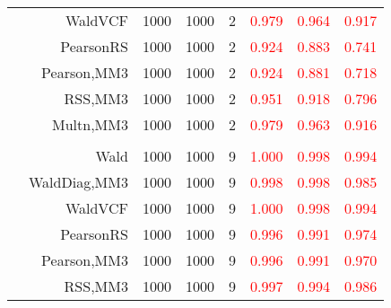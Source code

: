 \documentclass[
]{article}
\begin{document}
\begin{table}[H]
{\begin{tabular}[t]{lrrrrrrr}
\hspace{1em} & WaldVCF & 1000 & 1000 & 2 & \textcolor{red}{0.979} & \textcolor{red}{0.964} & \textcolor{red}{0.917}\\

\hspace{1em} & PearsonRS & 1000 & 1000 & 2 & \textcolor{red}{0.924} & \textcolor{red}{0.883} & \textcolor{red}{0.741}\\

\hspace{1em} & Pearson,MM3 & 1000 & 1000 & 2 & \textcolor{red}{0.924} & \textcolor{red}{0.881} & \textcolor{red}{0.718}\\

\hspace{1em} & RSS,MM3 & 1000 & 1000 & 2 & \textcolor{red}{0.951} & \textcolor{red}{0.918} & \textcolor{red}{0.796}\\

\hspace{1em} & Multn,MM3 & 1000 & 1000 & 2 & \textcolor{red}{0.979} & \textcolor{red}{0.963} & \textcolor{red}{0.916}\\
\cmidrule{1-8}
\addlinespace[0.3em]
\multicolumn{8}{l}{\textbf{1F 15V}}\\
\hspace{1em} & Wald & 1000 & 1000 & 9 & \textcolor{red}{1.000} & \textcolor{red}{0.998} & \textcolor{red}{0.994}\\

\hspace{1em} & WaldDiag,MM3 & 1000 & 1000 & 9 & \textcolor{red}{0.998} & \textcolor{red}{0.998} & \textcolor{red}{0.985}\\

\hspace{1em} & WaldVCF & 1000 & 1000 & 9 & \textcolor{red}{1.000} & \textcolor{red}{0.998} & \textcolor{red}{0.994}\\

\hspace{1em} & PearsonRS & 1000 & 1000 & 9 & \textcolor{red}{0.996} & \textcolor{red}{0.991} & \textcolor{red}{0.974}\\

\hspace{1em} & Pearson,MM3 & 1000 & 1000 & 9 & \textcolor{red}{0.996} & \textcolor{red}{0.991} & \textcolor{red}{0.970}\\

\hspace{1em} & RSS,MM3 & 1000 & 1000 & 9 & \textcolor{red}{0.997} & \textcolor{red}{0.994} & \textcolor{red}{0.986}\\


\end{tabular}}
\end{table}
\end{document}
